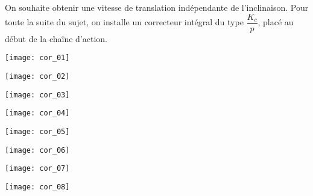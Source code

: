 On souhaite obtenir une vitesse de translation indépendante de l’inclinaison. Pour toute la suite du sujet, on installe un correcteur intégral du type $\dfrac{K_c}{p}$, placé au début de la chaîne d’action.

\ifprof
\begin{corrige}
\end{corrige}
\else
\fi


\ifprof
\begin{center}
	\texttt{[image: cor\_01]}
\end{center}

\begin{center}
	\texttt{[image: cor\_02]}
\end{center}

\begin{center}
	\texttt{[image: cor\_03]}
\end{center}

\begin{center}
	\texttt{[image: cor\_04]}
\end{center}

\begin{center}
	\texttt{[image: cor\_05]}
\end{center}

\begin{center}
	\texttt{[image: cor\_06]}
\end{center}

\begin{center}
	\texttt{[image: cor\_07]}
\end{center}

\begin{center}
	\texttt{[image: cor\_08]}
\end{center}
\else
\fi
